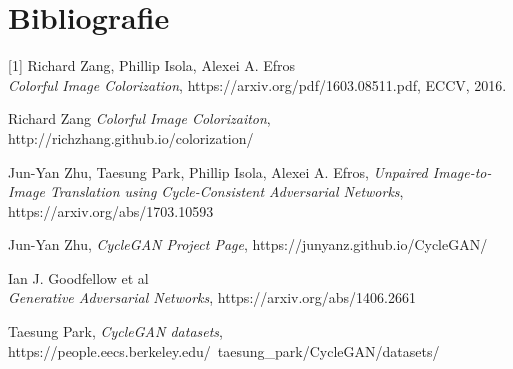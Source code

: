 \documentclass[12pt]{article}
\theoremstyle{definition}
\begin{document}
\section{Bibliografie}

[1] Richard Zang, Phillip Isola, Alexei A. Efros \\ \textit {Colorful Image Colorization}, https://arxiv.org/pdf/1603.08511.pdf, ECCV, 2016. \par
[2] Richard Zang \textit {Colorful Image Colorizaiton}, http://richzhang.github.io/colorization/ \par
[3] Jun-Yan Zhu, Taesung Park, Phillip Isola, Alexei A. Efros, \textit {Unpaired Image-to-Image Translation using Cycle-Consistent Adversarial Networks}, https://arxiv.org/abs/1703.10593 \par
[4] Jun-Yan Zhu, \textit{CycleGAN Project Page}, https://junyanz.github.io/CycleGAN/ \par
[5] Ian J. Goodfellow et al \\ \textit{Generative Adversarial Networks}, https://arxiv.org/abs/1406.2661 \par
[6] Taesung Park, \textit{CycleGAN datasets}, \\ https://people.eecs.berkeley.edu/~taesung\_park/CycleGAN/datasets/ \par
\end{document}
